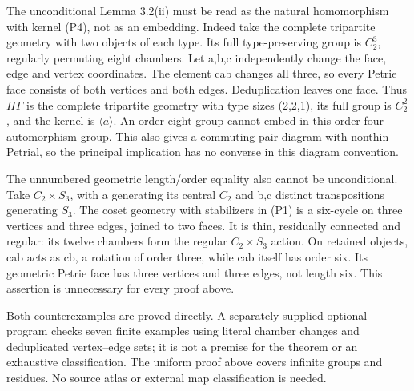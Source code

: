 The unconditional Lemma 3.2(ii) must be read as the natural homomorphism
with kernel (P4), not as an embedding. Indeed take the complete
tripartite geometry with two objects of each type. Its full
type-preserving group is \(C_{2}^{3}\), regularly permuting eight
chambers. Let a,b,c independently change the face, edge and vertex
coordinates. The element cab changes all three, so every Petrie face
consists of both vertices and both edges. Deduplication leaves one face.
Thus \(\Pi \Gamma\) is the complete tripartite geometry with type sizes
(2,2,1), its full group is \(C_{2}^{2}\), and the kernel is
\(\langle a\rangle\). An order-eight group cannot embed in this
order-four automorphism group. This also gives a commuting-pair diagram
with nonthin Petrial, so the principal implication has no converse in
this diagram convention.

The unnumbered geometric length/order equality also cannot be
unconditional. Take \(C_{2}\times S_{3}\), with a generating its central
\(C_{2}\) and b,c distinct transpositions generating \(S_{3}\). The
coset geometry with stabilizers in (P1) is a six-cycle on three vertices
and three edges, joined to two faces. It is thin, residually connected
and regular: its twelve chambers form the regular \(C_{2}\times S_{3}\)
action. On retained objects, cab acts as cb, a rotation of order three,
while cab itself has order six. Its geometric Petrie face has three
vertices and three edges, not length six. This assertion is unnecessary
for every proof above.

Both counterexamples are proved directly. A separately supplied optional
program checks seven finite examples using literal chamber changes and
deduplicated vertex--edge sets; it is not a premise for the theorem or
an exhaustive classification. The uniform proof above covers infinite
groups and residues. No source atlas or external map classification is
needed.
